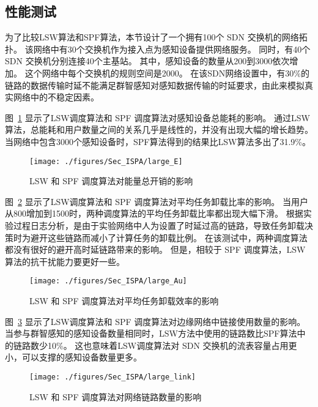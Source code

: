 \subsection{性能测试}

为了比较LSW算法和SPF算法，本节设计了一个拥有100个 SDN 交换机的网络拓扑。
该网络中有30个交换机作为接入点为感知设备提供网络服务。
同时，有40个 SDN 交换机分别连接40个主基站。
其中，感知设备的数量从200到3000依次增加。
这个网络中每个交换机的规则空间是2000。
在该SDN网络设置中，有30\%的链路的数据传输时延不能满足群智感知对感知数据传输的时延要求，由此来模拟真实网络中的不稳定因素。

图~\ref{fig_largeE} 显示了LSW调度算法和 SPF 调度算法对感知设备总能耗的影响。
通过LSW算法，总能耗和用户数量之间的关系几乎是线性的，并没有出现大幅的增长趋势。
当网络中包含3000个感知设备时，SPF算法得到的结果比LSW算法多出了31.9\%。

\begin{figure}[!h]
  \centering
  \texttt{[image: ./figures/Sec\_ISPA/large\_E]}
  \vspace{-0.5em}
  \caption{ LSW 和 SPF 调度算法对能量总开销的影响}
  \label{fig_largeE}
  \vspace{-1em}
\end{figure}

图~\ref{fig_largeAu} 显示了LSW调度算法和 SPF 调度算法对平均任务卸载比率的影响。
当用户从800增加到1500时，两种调度算法的平均任务卸载比率都出现大幅下滑。
根据实验过程日志分析，是由于实验网络中人为设置了时延过高的链路，导致任务卸载决策时为避开这些链路而减小了计算任务的卸载比例。
在该测试中，两种调度算法都没有很好的避开高时延链路带来的影响。
但是，相较于 SPF 调度算法，LSW算法的抗干扰能力要更好一些。

\begin{figure}[!h]
  \centering
  \texttt{[image: ./figures/Sec\_ISPA/large\_Au]}
  \vspace{-0.5em}
  \caption{LSW 和 SPF 调度算法对平均任务卸载效率的影响}
  \vspace{-1em}
  \label{fig_largeAu}
\end{figure}

图~\ref{fig_largeL} 显示了LSW调度算法和 SPF 调度算法对边缘网络中链接使用数量的影响。当参与群智感知的感知设备数量相同时，LSW方法中使用的链路数比SPF算法中的链路数少10\%。
这也意味着LSW调度算法对 SDN 交换机的流表容量占用更小，可以支撑的感知设备数量更多。

\begin{figure}[!h]
  \centering
  \texttt{[image: ./figures/Sec\_ISPA/large\_link]}
  \vspace{-0.5em}
  \caption{LSW 和 SPF 调度算法对网络链路数量的影响}
  \vspace{-1em}
  \label{fig_largeL}
\end{figure}

